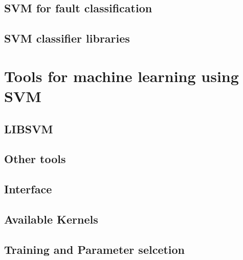 \subsection{SVM for fault classification}
\subsection{SVM classifier libraries}
\section{Tools for machine learning using SVM}
\label{sec:mltools}
\subsection{LIBSVM}
\subsection{Other tools}
\subsection{Interface}
\subsection{Available Kernels}
\subsection{Training and Parameter selcetion}
